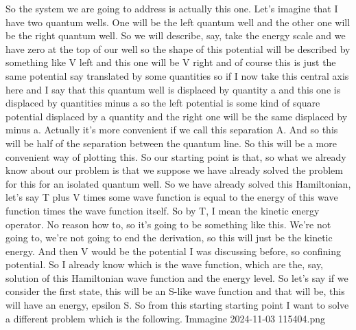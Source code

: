 So the system we are going to address is actually this one. Let's imagine that I have two quantum wells. One will be the left quantum well and the other one will be the right quantum well. So we will describe, say, take the energy scale and we have zero at the top of our well so the shape of this potential will be described by something like V left and this one will be V right and of course this is just the same potential say translated by some quantities so if I now take this central axis here and I say that this quantum well is displaced by quantity a and this one is displaced by quantities minus a so the left potential is some kind of square potential displaced by a quantity and the right one will be the same displaced by minus a. Actually it's more convenient if we call this separation A. And so this will be half of the separation between the quantum line. So this will be a more convenient way of plotting this. So our starting point is that, so what we already know about our problem is that we suppose we have already solved the problem for this for an isolated quantum well. So we have already solved this Hamiltonian, let's say T plus V times some wave function is equal to the energy of this wave function times the wave function itself. So by T, I mean the kinetic energy operator. No reason how to, so it's going to be something like this. We're not going to, we're not going to end the derivation, so this will just be the kinetic energy. And then V would be the potential I was discussing before, so confining potential. So I already know which is the wave function, which are the, say, solution of this Hamiltonian wave function and the energy level. So let's say if we consider the first state, this will be an S-like wave function and that will be, this will have an energy, epsilon S. So from this starting starting point I want to solve a different problem which is the following.
\f{Immagine 2024-11-03 115404.png}
